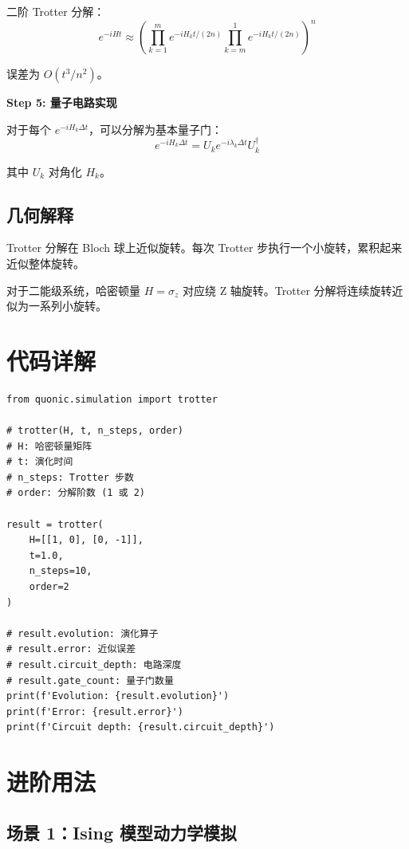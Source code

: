 \documentclass[12pt,a4paper]{article}
\begin{document}
二阶 Trotter 分解：
\begin{equation}
e^{-iHt} \approx \left(\prod_{k=1}^m e^{-iH_k t/(2n)} \prod_{k=m}^1 e^{-iH_k t/(2n)}\right)^n
\end{equation}

误差为 $O(t^3/n^2)$。

\textbf{Step 5: 量子电路实现}

对于每个 $e^{-iH_k \Delta t}$，可以分解为基本量子门：
\begin{equation}
e^{-iH_k \Delta t} = U_k e^{-i\lambda_k \Delta t} U_k^\dagger
\end{equation}

其中 $U_k$ 对角化 $H_k$。

\subsection{几何解释}

Trotter 分解在 Bloch 球上近似旋转。每次 Trotter 步执行一个小旋转，累积起来近似整体旋转。

对于二能级系统，哈密顿量 $H = \sigma_z$ 对应绕 Z 轴旋转。Trotter 分解将连续旋转近似为一系列小旋转。

\section{代码详解}

\begin{verbatim}
from quonic.simulation import trotter

# trotter(H, t, n_steps, order)
# H: 哈密顿量矩阵
# t: 演化时间
# n_steps: Trotter 步数
# order: 分解阶数 (1 或 2)

result = trotter(
    H=[[1, 0], [0, -1]],
    t=1.0,
    n_steps=10,
    order=2
)

# result.evolution: 演化算子
# result.error: 近似误差
# result.circuit_depth: 电路深度
# result.gate_count: 量子门数量
print(f'Evolution: {result.evolution}')
print(f'Error: {result.error}')
print(f'Circuit depth: {result.circuit_depth}')
\end{verbatim}

\section{进阶用法}

\subsection{场景 1：Ising 模型动力学模拟}
\end{document}
